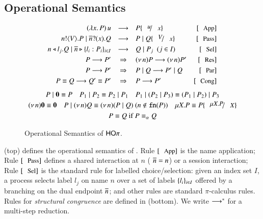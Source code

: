 \subsection{Operational Semantics}
\label{subsec:semantics}

\begin{figure}[!t]
\[
	\begin{array}{rclrcrclr}
		(\abs{x}{P}) \, u  & \red & P \subst{u}{x} 
		& \orule{App}
		\\[1mm]

		\bout{n}{V} P \Par \binp{\dual{n}}{x} Q & \red & P \Par Q \subst{V}{x} 
		& \orule{Pass}
		\\[1mm]

		\bsel{n}{l_j} Q \Par \bbra{\dual{n}}{l_i : P_i}_{i \in I} & \red & Q \Par P_j ~~(j \in I)~~ 
		& \orule{Sel}
		\\[1mm]

		P \red P' & \Rightarrow & \news{n} P  \red  \news{n} P' 
		& \orule{Res}
		\\[1mm]

		P \red P' & \Rightarrow  &  P \Par Q  \red   P' \Par Q  
		& \orule{Par}
		\\[1mm]

		P \scong Q \red Q' \scong P' & \Rightarrow & P  \red  P'
		& \orule{Cong}
	\end{array}
\]
{\small
\[
	\begin{array}{c}
		P \Par \inact \scong P
		\quad
		P_1 \Par P_2 \scong P_2 \Par P_1
		\quad
		P_1 \Par (P_2 \Par P_3) \scong (P_1 \Par P_2) \Par P_3
		\\[1mm]
		\news{n} \inact \scong \inact
		\quad 
		P \Par \news{n} Q \scong \news{n}(P \Par Q)
		\	(n \notin \fn{P})\quad 
		\recp{X}{P} \scong P\subst{\recp{X}{P}}{\rvar{X}}
		\\[1mm]
		P \scong Q \textrm{ if } P \scong_\alpha Q
	\end{array}
\]
}
\caption{Operational Semantics of $\mathsf{HO}\pi$. 
\label{fig:reduction}}
\Hlinefig
\end{figure}
\noindent {} (top) defines the operational semantics 
of \HOp.
Rule $\orule{App}$ is the name application; 
Rule $\orule{Pass}$ defines a shared interaction at $n$ 
( $\overline{n}=n$) or a session interaction;  
Rule $\orule{Sel}$ is the standard rule for labelled choice/selection:
given an index set $I$, 
a process selects label $l_j$ on name $n$ over a set of
labels $\{l_i\}_{i \in I}$ offered by a branching 
on the dual endpoint $\overline{n}$; and other rules are standard
$\pi$-calculus rules.
Rules for \emph{structural congruence} are defined in  (bottom). 
We write $\longrightarrow^\ast$ for a multi-step reduction. 
